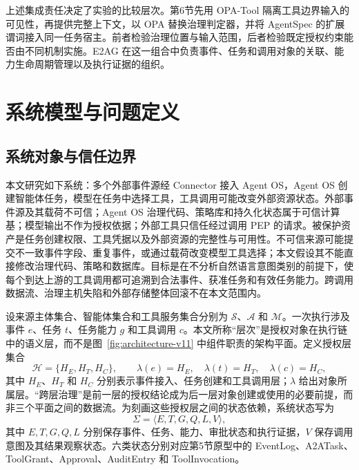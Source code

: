 上述集成责任决定了实验的比较层次。第6节先用 OPA-Tool 隔离工具边界输入的可见性，再提供完整上下文，以 OPA 替换治理判定器，并将 AgentSpec 的扩展谓词接入同一任务宿主。前者检验治理位置与输入范围，后者检验既定授权约束能否由不同机制实施。E2AG 在这一组合中负责事件、任务和调用对象的关联、能力生命周期管理以及执行证据的组织。

\section{系统模型与问题定义}\label{sec:problem-v11}

\subsection{系统对象与信任边界}

本文研究如下系统：多个外部事件源经 Connector 接入 Agent OS，Agent OS 创建智能体任务，模型在任务中选择工具，工具调用可能改变外部资源状态。外部事件源及其载荷不可信；Agent OS 治理代码、策略库和持久化状态属于可信计算基；模型输出不作为授权依据；外部工具只信任经过调用 PEP 的请求。被保护资产是任务创建权限、工具凭据以及外部资源的完整性与可用性。不可信来源可能提交不一致事件字段、重复事件，或通过载荷改变模型工具选择；本文假设其不能直接修改治理代码、策略和数据库。目标是在不分析自然语言意图类别的前提下，使每个到达上游的工具调用都可追溯到合法事件、获准任务和有效任务能力。跨调用数据流、治理主机失陷和外部存储整体回滚不在本文范围内。

设来源主体集合、智能体集合和工具服务集合分别为 $\mathcal{S}$、$\mathcal{A}$ 和 $\mathcal{M}$。一次执行涉及事件 $e$、任务 $t$、任务能力 $g$ 和工具调用 $c$。本文所称“层次”是授权对象在执行链中的语义层，而不是图~\ref{fig:architecture-v11} 中组件职责的架构平面。定义授权层集合
\begin{equation}
\mathcal{H}=\{H_E,H_T,H_C\},\qquad
\lambda(e)=H_E,\quad \lambda(t)=H_T,\quad \lambda(c)=H_C,
\label{eq:authorization-layers-v11}
\end{equation}
其中 $H_E$、$H_T$ 和 $H_C$ 分别表示事件接入、任务创建和工具调用层；$\lambda$ 给出对象所属层。“跨层治理”是前一层的授权结论成为后一层对象创建或使用的必要前提，而非三个平面之间的数据流。为刻画这些授权层之间的状态依赖，系统状态写为
\begin{equation}
\Sigma=\langle E,T,G,Q,L,V\rangle,
\label{eq:system-state-v11}
\end{equation}
其中 $E,T,G,Q,L$ 分别保存事件、任务、能力、审批状态和执行证据，$V$ 保存调用意图及其结果观察状态。六类状态分别对应第5节原型中的 EventLog、A2ATask、ToolGrant、Approval、AuditEntry 和 ToolInvocation。

